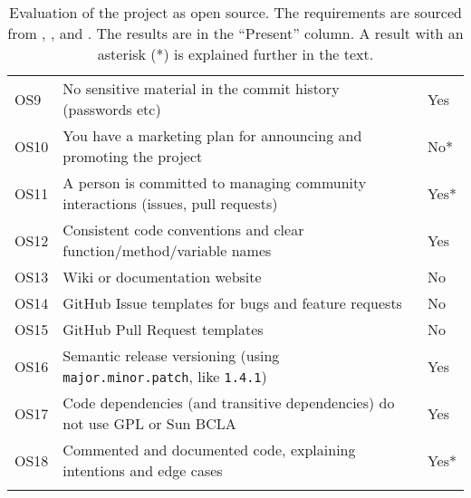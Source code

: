 \begin{longtable}{@{}lp{9cm}l@{}}
\rowcolor[HTML]{EFEFEF} 
OS9                         & No sensitive material in the commit history (passwords etc)                      & Yes  \\
OS10                        & You have a marketing plan for announcing and promoting the project               & No*  \\
\rowcolor[HTML]{EFEFEF} 
OS11                        & A person is committed to managing community interactions (issues, pull requests) & Yes* \\
OS12                        & Consistent code conventions and clear function/method/variable names             & Yes  \\
\rowcolor[HTML]{EFEFEF} 
OS13                        & Wiki or documentation website                                                    & No   \\
OS14                        & GitHub Issue templates for bugs and feature requests                             & No   \\
\rowcolor[HTML]{EFEFEF} 
OS15                        & GitHub Pull Request templates                                                    & No   \\
OS16                        & Semantic release versioning (using \texttt{major.minor.patch}, like \texttt{1.4.1})                & Yes  \\
\rowcolor[HTML]{EFEFEF} 
OS17 & Code dependencies (and transitive dependencies) do not use GPL or Sun BCLA & Yes \\
OS18                        & Commented and documented code, explaining intentions and edge cases              & Yes* \\* \bottomrule
\caption{Evaluation of the project as \gls{open source}.
The requirements are sourced from \textcite{mikelinksvayerStartingOpenSource2020}, \textcite{dannyguoMakeREADME2020}, \textcite{beatonThirdPartyContent2017} and \textcite{waynebeatonEclipseProjectHandbook2020}.
The results are in the ``Present'' column.
A result with an asterisk (*) is explained further in the text.}
\label{tab:open-source-evaluation}\\
\end{longtable}